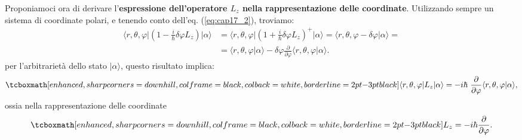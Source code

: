 Proponiamoci ora di derivare l'\textbf{espressione dell'operatore $L_z$ nella rappresentazione delle coordinate}. Utilizzando sempre un sistema di coordinate polari, e tenendo conto dell'eq. (\ref{eq:cap17_2}), troviamo:
	\begin{align}
		\langle r, \theta, \varphi \vert \left(1- \frac{i}{\hbar}\delta \varphi L_z\right) \vert \alpha\rangle &= \langle r, \theta, \varphi \vert \left(1+ \frac{i}{\hbar}\delta \varphi L_z\right) ^+ \vert \alpha\rangle =  \langle r, \theta, \varphi - \delta \varphi \vert\alpha\rangle  = \nonumber \\
		&= \langle r, \theta, \varphi \vert \alpha\rangle - \delta \varphi \frac{\partial}{\partial \varphi}\langle r, \theta, \varphi \vert\alpha\rangle .
	\end{align}
per l'arbitrarietà dello stato $\vert \alpha \rangle$, questo risultato implica:
	\begin{equation}
		\tcboxmath[enhanced, sharp corners=downhill, colframe=black, colback=white, borderline={2pt}{-3pt}{black}]{
			\langle r, \theta, \varphi \vert  L_z \vert \alpha\rangle =- i\hbar\ \frac{\partial}{\partial \varphi}\langle r, \theta, \varphi \vert\alpha\rangle ,
			}
	\end{equation}
ossia nella rappresentazione delle coordinate
	\begin{equation}
		\tcboxmath[enhanced, sharp corners=downhill, colframe=black, colback=white, borderline={2pt}{-3pt}{black}]{
			L_z = -i\hbar \frac{\partial}{\partial \varphi}.
			}
	\label{eq:cap17_4}
	\end{equation}\\
	
